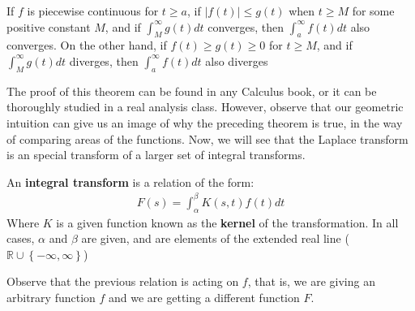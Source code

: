 \begin{thm}
	If $f$ is piecewise continuous for $t \geq a$, if $ \vert f(t) \vert \leq g(t) $ when $t \geq M$ for some positive constant $M$, and if $ \int_M^\infty g(t)dt $ converges, then $ \int_a^{\infty} f(t) dt $ also converges. On the other hand, if $f(t) \geq g(t) \geq 0 $ for $ t \geq M$, and if $ \int_M^{\infty} g(t) dt $ diverges, then $ \int_a^{\infty} f(t) dt $ also diverges
\end{thm} 
The proof of this theorem can be found in any Calculus book, or it can be thoroughly studied in a real analysis class.
However, observe that our geometric intuition can give us an image of why the preceding theorem is true, in the way of comparing areas of the functions.
Now, we will see that the Laplace transform is an special transform of a larger set of integral transforms.
\begin{define}
	An \textbf{integral transform} is a relation of the form:
	\begin{align*}
	F(s) = \int_{\alpha}^{\beta} K(s,t)f(t) dt
	\end{align*}
	Where $K$ is a given function known as the \textbf{kernel} of the transformation. In all cases, $ \alpha $ and $ \beta$ are given, and are elements of the extended real line ($\mathbb{R} \cup \left\lbrace  -\infty,\infty \right\rbrace$) 
	\end{define}
Observe that the previous relation is acting on $f$, that is, we are giving an arbitrary function $f$ and we are getting a different function $F$.

